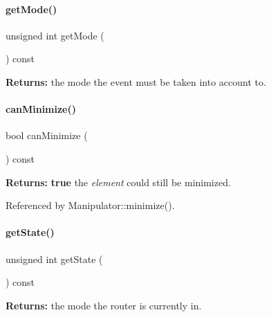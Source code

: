 \paragraph{\texorpdfstring{get\+Mode()}{getMode()}}
{\footnotesize\ttfamily unsigned int get\+Mode (\begin{DoxyParamCaption}{ }\end{DoxyParamCaption}) const\hspace{0.3cm}{\ttfamily [inline]}}

{\bfseries Returns\+:} the mode the event must be taken into account to. \mbox{\label{classKite_1_1RoutingEvent_a85d665e52caee3e804921f52417b0074}} 
\paragraph{\texorpdfstring{can\+Minimize()}{canMinimize()}}
{\footnotesize\ttfamily bool can\+Minimize (\begin{DoxyParamCaption}{ }\end{DoxyParamCaption}) const\hspace{0.3cm}{\ttfamily [inline]}}

{\bfseries Returns\+:} {\bfseries true} the {\itshape element} could still be minimized. 

Referenced by Manipulator\+::minimize().

\mbox{\label{classKite_1_1RoutingEvent_a40ec2b23684a0e6e6d7ac9783a269037}} 
\paragraph{\texorpdfstring{get\+State()}{getState()}}
{\footnotesize\ttfamily unsigned int get\+State (\begin{DoxyParamCaption}{ }\end{DoxyParamCaption}) const}

{\bfseries Returns\+:} the mode the router is currently in. \mbox{\label{classKite_1_1RoutingEvent_ade1e79e88bf4f4c173ffd083dd5470c9}} 

